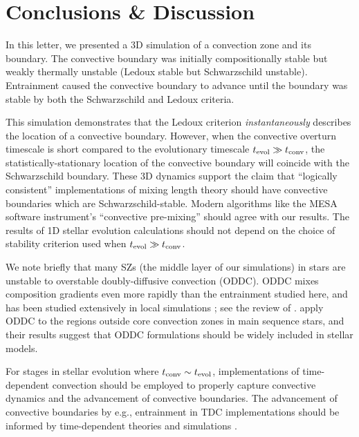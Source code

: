 \section{Conclusions \& Discussion}
\label{sec:conclusions}

In this letter, we presented a 3D simulation of a convection zone and its boundary.
The convective boundary was initially compositionally stable but weakly thermally unstable (Ledoux stable but Schwarzschild unstable).
Entrainment caused the convective boundary to advance until the boundary was stable by both the Schwarzschild and Ledoux criteria.

This simulation demonstrates that the Ledoux criterion \emph{instantaneously} describes the location of a convective boundary.
However, when the convective overturn timescale is short compared to the evolutionary timescale $t_{\rm{evol}} \gg t_{\rm{conv}}$, the statistically-stationary location of the convective boundary will coincide with the Schwarzschild boundary.
These 3D dynamics support the claim that ``logically consistent'' implementations of mixing length theory \citep{gabriel_etal_2014, mesa4, mesa5} should have convective boundaries which are Schwarzschild-stable.
Modern algorithms like the MESA software instrument's ``convective pre-mixing'' \citep[CPM,][]{mesa5} should agree with our results.
The results of 1D stellar evolution calculations should not depend on the choice of stability criterion used when $t_{\rm{evol}} \gg t_{\rm{conv}}$.


We note briefly that many SZs (the middle layer of our simulations) in stars are unstable to overstable doubly-diffusive convection (ODDC).
ODDC mixes composition gradients even more rapidly than the entrainment studied here, and has been studied extensively in local simulations \citep{mirouh_etal_2012, wood_etal_2013, xie_etal_2017}; see the review of \citet{garaud_2018}.
\citet{moore_garaud_2016} apply ODDC to the regions outside core convection zones in main sequence stars, and their results suggest that ODDC formulations should be widely included in stellar models.

For stages in stellar evolution where $t_{\rm{conv}} \sim t_{\rm{evol}}$, implementations of time-dependent convection \citep[TDC,][]{tdc_1986} should be employed to properly capture convective dynamics and the advancement of convective boundaries.
The advancement of convective boundaries by e.g., entrainment in TDC implementations should be informed by time-dependent theories and simulations \citep[e.g.,][]{turner_1968, fuentes_cumming_2020}.

